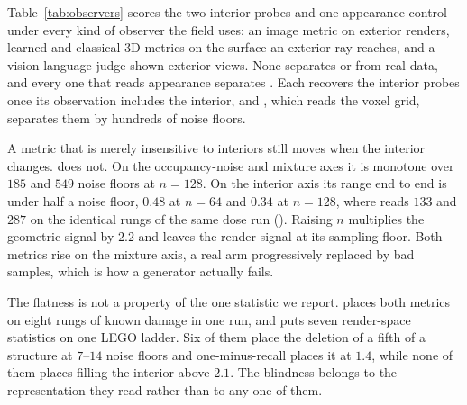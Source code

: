 Table~\ref{tab:observers} scores the two interior probes and one appearance control under
every kind of observer the field uses: an image metric on exterior renders, learned and
classical 3D metrics on the surface an exterior ray reaches, and a vision-language judge
shown exterior views. None separates \solidify{} or \hollow{} from real data, and every
one that reads appearance separates \matshuffle{}. Each recovers the interior probes once
its observation includes the interior, and \vkid{}, which reads the voxel grid, separates
them by hundreds of noise floors.

A metric that is merely insensitive to interiors still moves when the interior changes.
\mvkid{} does not. On the occupancy-noise and mixture axes it is monotone over $185$ and
$549$ noise floors at $n{=}128$. On the interior axis its range end to end is under half a
noise floor, $0.48$ at $n{=}64$ and $0.34$ at $n{=}128$, where \vkid{} reads $133$ and $287$
on the identical rungs of the same dose run (). Raising $n$ multiplies the
geometric signal by $2.2$ and leaves the render signal at its sampling floor. Both metrics
rise on the mixture axis, a real arm progressively replaced by bad samples, which is how a
generator actually fails.

The flatness is not a property of the one statistic we report.  places
both metrics on eight rungs of known damage in one run, and  puts seven
render-space statistics on one LEGO ladder. Six of them place the deletion of a fifth of a
structure at $7$--$14$ noise floors and one-minus-recall places it at $1.4$, while none of
them places filling the interior above $2.1$. The blindness belongs to the representation
they read rather than to any one of them.

